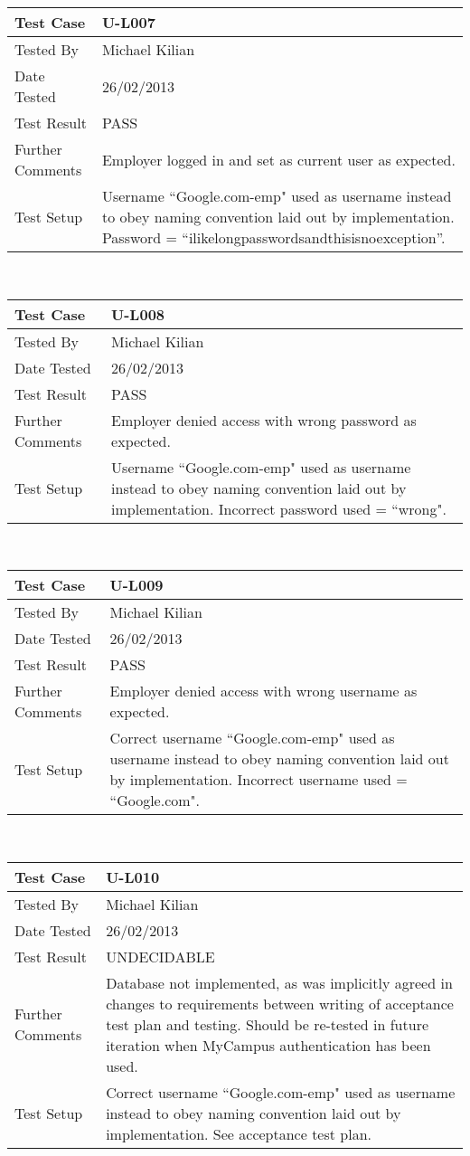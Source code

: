 \documentclass{l3deliverable}
\begin{document}
\begin{tabular}{lp{10cm}}
\hline 
\textbf{Test Case} & U-L007\tabularnewline
\hline 
\hline 
Tested By & Michael Kilian\tabularnewline
\hline 
Date Tested & 26/02/2013\tabularnewline
\hline 
Test Result & PASS\tabularnewline
\hline
Further Comments &  Employer logged in and set as current user as expected. \tabularnewline
\hline
Test Setup & Username ``Google.com-emp" used as username instead to obey naming convention laid out by implementation. Password = ``ilikelongpasswordsandthisisnoexception''. \tabularnewline
\hline
\end{tabular}\\

\begin{tabular}{lp{10cm}}
\hline 
\textbf{Test Case} & U-L008\tabularnewline
\hline 
\hline 
Tested By & Michael Kilian\tabularnewline
\hline 
Date Tested & 26/02/2013\tabularnewline
\hline 
Test Result & PASS\tabularnewline
\hline
Further Comments &  Employer denied access with wrong password as expected. \tabularnewline
\hline
Test Setup & Username ``Google.com-emp" used as username instead to obey naming convention laid out by implementation. Incorrect password used = ``wrong". \tabularnewline
\hline
\end{tabular}\\

\begin{tabular}{lp{10cm}}
\hline 
\textbf{Test Case} & U-L009\tabularnewline
\hline 
\hline 
Tested By & Michael Kilian\tabularnewline
\hline 
Date Tested & 26/02/2013\tabularnewline
\hline 
Test Result & PASS\tabularnewline
\hline
Further Comments &  Employer denied access with wrong username as expected. \tabularnewline
\hline
Test Setup & Correct username ``Google.com-emp" used as username instead to obey naming convention laid out by implementation. Incorrect username used = ``Google.com". \tabularnewline
\hline
\end{tabular}\\

\begin{tabular}{lp{10cm}}
\hline 
\textbf{Test Case} & U-L010\tabularnewline
\hline 
\hline 
Tested By & Michael Kilian\tabularnewline
\hline 
Date Tested & 26/02/2013\tabularnewline
\hline 
Test Result & UNDECIDABLE\tabularnewline
\hline
Further Comments &   Database not implemented, as was implicitly agreed in changes to requirements between writing of acceptance test plan and testing. Should be re-tested in future iteration when MyCampus authentication has been used. \tabularnewline
\hline
Test Setup & Correct username ``Google.com-emp" used as username instead to obey naming convention laid out by implementation. See acceptance test plan. \tabularnewline
\hline
\end{tabular}\\
\end{document}
